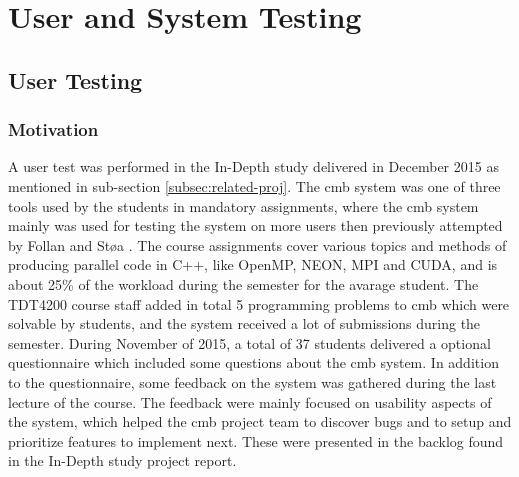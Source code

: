 \chapter{User and System Testing}

\section{User Testing}

\subsection{Motivation}
A user test was performed in the In-Depth study delivered in December 2015 as mentioned in sub-section \ref{subsec:related-proj}. The \gls{cmb} system was one of three tools used by the students in mandatory assignments, where the \gls{cmb} system mainly was used for testing the system on more users then previously attempted by Follan and Støa \cite{mt:T&S}. The course assignments cover various topics and methods of producing parallel code in C++, like OpenMP, NEON, MPI and CUDA, and is about 25\% of the workload during the semester for the avarage student. The TDT4200 course staff added in total 5 programming problems to \gls{cmb} which were solvable by students, and the system received a lot of submissions during the semester. During November of 2015, a total of 37 students delivered a optional questionnaire which included some questions about the \gls{cmb} system. In addition to the questionnaire, some feedback on the system was gathered during the last lecture of the course. The feedback were mainly focused on usability aspects of the system, which helped the \gls{cmb} project team to discover bugs and to setup and prioritize features to implement next. These were presented in the backlog found in the In-Depth study project report. \\

